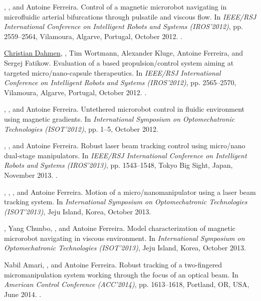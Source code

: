 \begin{Mybibliography}{10}
  \KBelharet, \DavidFolio, and Antoine Ferreira.
  \newblock Control of a magnetic microrobot navigating in microfluidic arterial
  bifurcations through pulsatile and viscous flow.
  \newblock In \emph{IEEE/RSJ International Conference on Intelligent Robots and
    Systems (IROS'2012)}, pp. 2559--2564, Vilamoura, Algarve, Portugal, October
  2012{}.
  \newblock {}.

  
  \uline{Christian Dahmen}, \DavidFolio, Tim Wortmann, Alexander Kluge, Antoine Ferreira,
  and Sergej Fatikow.
  \newblock Evaluation of a {\MRIshort} based propulsion/control system aiming at
  targeted micro/nano-capsule therapeutics.
  \newblock In \emph{IEEE/RSJ International Conference on Intelligent Robots and
    Systems (IROS'2012)}, pp. 2565--2570, Vilamoura, Algarve, Portugal, October
  2012.
  \newblock {}.
    
  \KBelharet, \DavidFolio, and Antoine Ferreira.
  \newblock Untethered microrobot control in fluidic environment using magnetic
  gradients.
  \newblock In \emph{International Symposium on Optomechatronic Technologies
    (ISOT'2012)}, pp. 1--5, October 2012{}.
  
  
  \NAmari, \DavidFolio, and Antoine Ferreira.
  \newblock Robust laser beam tracking control using micro/nano dual-stage
  manipulators.
  \newblock In \emph{IEEE/RSJ International Conference on Intelligent Robots and
    Systems (IROS'2013)}, pp. 1543--1548, Tokyo Big Sight, Japan, November
  2013{}.
  \newblock {}.
  
  
  \NAmari, \DavidFolio, \KBelharet, and Antoine Ferreira.
  \newblock Motion of a micro/nanomanipulator using a laser beam tracking system.
  \newblock In \emph{International Symposium on Optomechatronic Technologies
    (ISOT'2013)}, Jeju Island, Korea, October 2013{}.
  

  \KBelharet, Yang Chunbo, \DavidFolio, and Antoine Ferreira.
  \newblock Model characterization of magnetic microrobot navigating in viscous
  environment.
  \newblock In \emph{International Symposium on Optomechatronic Technologies
    (ISOT'2013)}, Jeju Island, Korea, October 2013{}.
  
  Nabil Amari, \DavidFolio, and Antoine Ferreira.
  \newblock Robust tracking of a two-fingered micromanipulation system working
  through the focus of an optical beam.
  \newblock In \emph{American Control Conference (ACC'2014)}, pp. 1613--1618,
  Portland, OR, USA, June 2014{}.
  \newblock {}.
  

\end{Mybibliography}
